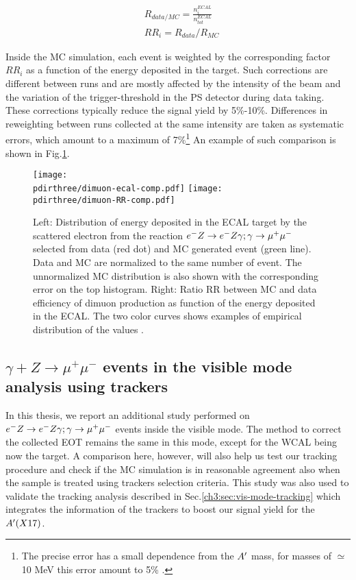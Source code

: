 \begin{equation}  
  \label{eq:RR-factor}
  \begin{aligned}
  &R_{data/MC} = \frac{n_i^{ECAL}}{n_{tot}^{ECAL}} \\
  &RR_i = R_{data}/R_{MC}
  \end{aligned}
\end{equation}

Inside the MC simulation, each event is weighted by the corresponding factor $RR_i$ as a function of the energy deposited in the target. Such corrections are different between runs and are mostly affected by the intensity of the beam and the variation of the trigger-threshold in the PS detector during data taking. These corrections typically reduce the signal yield by 5\%-10\%. Differences in reweighting between runs collected at the same intensity are taken as systematic errors, which amount to a maximum of 7\%\footnote{The precise error has a small dependence from the $A'$ mass, for masses of $\simeq$10 MeV this error amount to 5\% \cite{na64-prd}.} An example of such comparison is shown in Fig.\ref{fig:dimuon-comp-invis}.

\begin{figure}[tbh!]
  \centering
  \texttt{[image: \\pdirthree/dimuon-ecal-comp.pdf]}
  \texttt{[image: \\pdirthree/dimuon-RR-comp.pdf]}
  \caption[Dimuon spectra in ECAL for data and MC.]{Left: Distribution of energy deposited in the ECAL target by the scattered electron from the reaction $e^- Z \to e^- Z \gamma; \gamma \to \mu^+ \mu^-$ selected from data (red dot) and MC generated event (green line). Data and MC are normalized to the same number of event. The unnormalized MC distribution is also shown with the corresponding error on the top histogram. Right: Ratio RR between MC and data efficiency of dimuon production as function of the energy deposited in the ECAL. The two color curves shows examples of empirical distribution of the values \cite{na64-prd}.}
  \label{fig:dimuon-comp-invis}
\end{figure}

\subsection{$\gamma + Z \rightarrow \mu^+ \mu^-$ events in the visible mode analysis using trackers}

In this thesis, we report an additional study performed on $e^- Z \to e^- Z \gamma; \gamma \to \mu^+ \mu^-$ events inside the visible mode. The method to correct the collected EOT remains the same in this mode, except for the WCAL being now the target. A comparison here, however, will also help us test our tracking procedure and check if the MC simulation is in reasonable agreement also when the sample is treated using trackers selection criteria. This study was also used to validate the tracking analysis described in Sec.\ref{ch3:sec:vis-mode-tracking} which integrates the information of the trackers to boost our signal yield for the $A'(X17)$.

